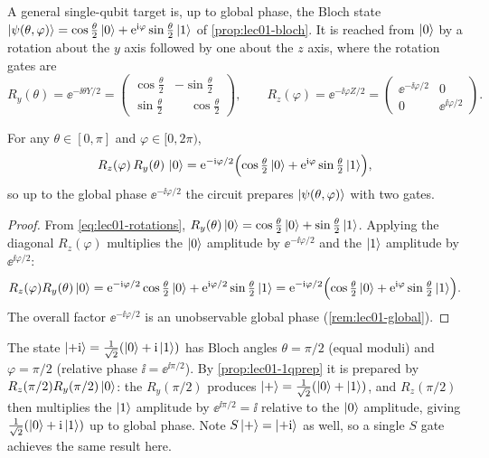A general single-qubit target is, up to global phase, the Bloch state
$\ket{\psi(\theta,\varphi)}=\cos\tfrac{\theta}{2}\ket{0}+\mathrm{e}^{\mathrm{i}\varphi}\sin\tfrac{\theta}{2}\ket{1}$
of \cref{prop:lec01-bloch}. It is reached from $\ket{0}$ by a rotation about the $y$
axis followed by one about the $z$ axis, where the rotation gates are
\begin{equation}\label{eq:lec01-rotations}
  R_{y}(\theta)=\ee^{-\ii\theta Y/2}
    =\begin{pmatrix}\cos\tfrac{\theta}{2}&-\sin\tfrac{\theta}{2}\\[2pt]
      \sin\tfrac{\theta}{2}&\phantom{-}\cos\tfrac{\theta}{2}\end{pmatrix},
  \qquad
  R_{z}(\varphi)=\ee^{-\ii\varphi Z/2}
    =\begin{pmatrix}\ee^{-\ii\varphi/2}&0\\ 0&\ee^{\ii\varphi/2}\end{pmatrix}.
\end{equation}

\begin{proposition}\label{prop:lec01-1qprep}
For any $\theta\in[0,\pi]$ and $\varphi\in[0,2\pi)$,
\[
  R_{z}(\varphi)\,R_{y}(\theta)\,\ket{0}
    =\mathrm{e}^{-\mathrm{i}\varphi/2}\Bigl(\cos\tfrac{\theta}{2}\ket{0}+\mathrm{e}^{\mathrm{i}\varphi}\sin\tfrac{\theta}{2}\ket{1}\Bigr),
\]
so up to the global phase $\ee^{-\ii\varphi/2}$ the circuit prepares
$\ket{\psi(\theta,\varphi)}$ with two gates.
\end{proposition}

\begin{proof}
From \eqref{eq:lec01-rotations},
$R_{y}(\theta)\ket{0}=\cos\tfrac{\theta}{2}\ket{0}+\sin\tfrac{\theta}{2}\ket{1}$.
Applying the diagonal $R_{z}(\varphi)$ multiplies the $\ket{0}$ amplitude by
$\ee^{-\ii\varphi/2}$ and the $\ket{1}$ amplitude by $\ee^{\ii\varphi/2}$:
\[
  R_{z}(\varphi)R_{y}(\theta)\ket{0}
    =\mathrm{e}^{-\mathrm{i}\varphi/2}\cos\tfrac{\theta}{2}\ket{0}
     +\mathrm{e}^{\mathrm{i}\varphi/2}\sin\tfrac{\theta}{2}\ket{1}
    =\mathrm{e}^{-\mathrm{i}\varphi/2}\Bigl(\cos\tfrac{\theta}{2}\ket{0}+\mathrm{e}^{\mathrm{i}\varphi}\sin\tfrac{\theta}{2}\ket{1}\Bigr).
\]
The overall factor $\ee^{-\ii\varphi/2}$ is an unobservable global phase
(\cref{rem:lec01-global}).
\end{proof}

\begin{example}\label{exa:lec01-prepplusi}
The state $\ket{+\mathrm{i}}=\tfrac{1}{\sqrt2}(\ket{0}+\mathrm{i}\ket{1})$ has Bloch angles
$\theta=\pi/2$ (equal moduli) and $\varphi=\pi/2$ (relative phase $\ii=\ee^{\ii\pi/2}$).
By \cref{prop:lec01-1qprep} it is prepared by $R_{z}(\pi/2)R_{y}(\pi/2)\ket{0}$: the
$R_{y}(\pi/2)$ produces $\ket{+}=\tfrac{1}{\sqrt2}(\ket{0}+\ket{1})$, and
$R_{z}(\pi/2)$ then multiplies the $\ket{1}$ amplitude by $\ee^{\ii\pi/2}=\ii$
relative to the $\ket{0}$ amplitude, giving $\tfrac{1}{\sqrt2}(\ket{0}+\mathrm{i}\ket{1})$ up
to global phase. Note $S\ket{+}=\ket{+\mathrm{i}}$ as well, so a single $S$ gate achieves the
same result here.
\end{example}

